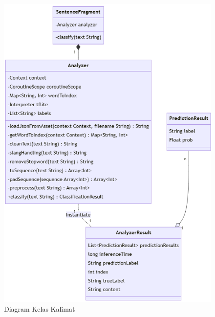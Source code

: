 \begin{figure}[H]
  \centering
  \includegraphics[scale=0.67]{assets/class_diagram_kalimat.png}
  \caption{Diagram Kelas Kalimat}
  \label{fig:class_diagram_kalimat}
\end{figure}

